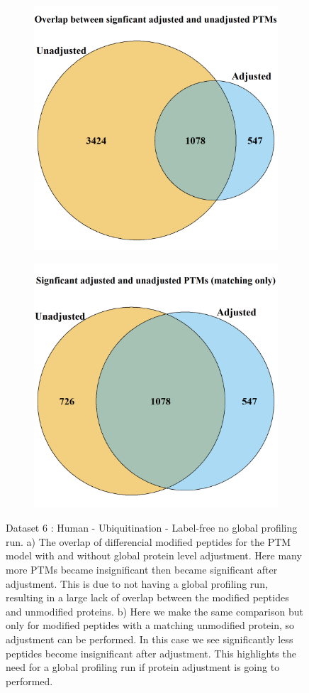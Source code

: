 \documentclass[mcp]{article}
\numberwithin{table}{section}
\begin{document}
\begin{figure}[h!]
\centering
 \begin{subfigure}{\textwidth}
 \centering
	\includegraphics[height=.525\textwidth]{images/usp30_venn_diagramm}
	\caption{}
 \end{subfigure}
 \begin{subfigure}{\textwidth}
 \centering
	\includegraphics[height=.525\textwidth]{images/usp30_venn_diagramm_matching_only}
	\caption{}
 \end{subfigure}
 \caption{Dataset 6 : Human - Ubiquitination - Label-free no global profiling run. a) The overlap of differencial modified peptides for the PTM model with and without global protein level adjustment. Here many more PTMs became insignificant then became significant after adjustment. This is due to not having a global profiling run, resulting in a large lack of overlap between the modified peptides and unmodified proteins. b) Here we make the same comparison but only for modified peptides with a matching unmodified protein, so adjustment can be performed. In this case we see significantly less peptides become insignificant after adjustment. This highlights the need for a global profiling run if protein adjustment is going to performed.}
\label{fig:usp30_ven_d}
\end{figure}
\end{document}
